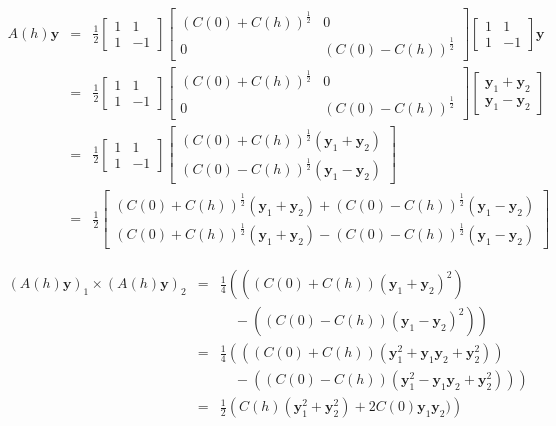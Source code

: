 \documentclass[12pt]{article}
\theoremstyle{definition}
\theoremstyle{remark}
\newcommand{\signal}{\mathbf{y}}
\begin{document}
\begin{eqnarray*}
A(h)\signal&=&\frac12\begin{bmatrix}1&1\\1&-1\end{bmatrix}\begin{bmatrix}(C(0)+C(h))^{\frac12}&0\\0&(C(0)-C(h))^{\frac12}\end{bmatrix}\begin{bmatrix}1&1\\1&-1\end{bmatrix}\signal\\
&=&\frac12\begin{bmatrix}1&1\\1&-1\end{bmatrix}\begin{bmatrix}(C(0)+C(h))^{\frac12}&0\\0&(C(0)-C(h))^{\frac12}\end{bmatrix}\begin{bmatrix}\signal_1+\signal_2\\\signal_1-\signal_2\end{bmatrix}\\
&=&\frac12\begin{bmatrix}1&1\\1&-1\end{bmatrix}\begin{bmatrix}(C(0)+C(h))^{\frac12}(\signal_1+\signal_2)\\(C(0)-C(h))^{\frac12}(\signal_1-\signal_2)\end{bmatrix}\\
&=&\frac12\begin{bmatrix}(C(0)+C(h))^{\frac12}(\signal_1+\signal_2)+(C(0)-C(h))^{\frac12}(\signal_1-\signal_2)\\(C(0)+C(h))^{\frac12}(\signal_1+\signal_2)-(C(0)-C(h))^{\frac12}(\signal_1-\signal_2)\end{bmatrix}\end{eqnarray*}

\begin{eqnarray*}
(A(h)\signal)_1\times (A(h)\signal)_2&=&
\frac14 \left(\left((C(0)+C(h))(\signal_1+\signal_2)^2\right)\right.\\
&&\quad-\left.
\left((C(0)-C(h))(\signal_1-\signal_2)^2\right)\right)\\
&=&
\frac14 \left(\left((C(0)+C(h))(\signal_1^2+\signal_1\signal_2+\signal_2^2)\right)\right.\\
&&\quad-\left.
\left((C(0)-C(h))(\signal_1^2-\signal_1\signal_2+\signal_2^2)\right)\right)\\
&=&
\frac12 \left(C(h)(\signal_1^2+\signal_2^2)+2C(0)\signal_1\signal_2)\right)
\end{eqnarray*}
\end{document}
